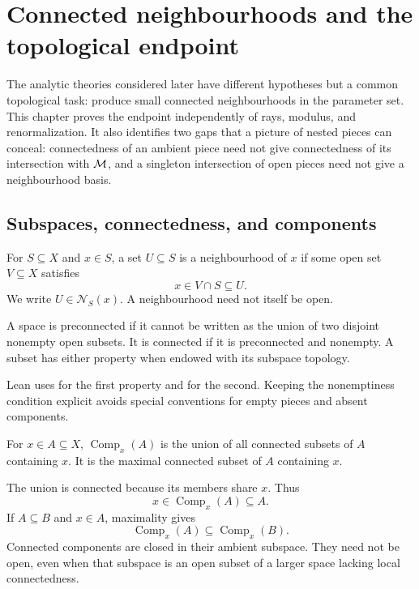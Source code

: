 \chapter[Connected neighbourhoods and topological endpoints]{Connected neighbourhoods and the topological endpoint}
\label{chap:topological-foundations}

The analytic theories considered later have different hypotheses but a
common topological task: produce small connected neighbourhoods in the
parameter set.  This chapter proves the endpoint independently of rays,
modulus, and renormalization.  It also identifies two gaps that a picture
of nested pieces can conceal: connectedness of an ambient piece need not
give connectedness of its intersection with $\mathcal M$, and a singleton
intersection of open pieces need not give a neighbourhood basis.

\section{Subspaces, connectedness, and components}

\begin{definition}
For $S\subseteq X$ and $x\in S$, a set $U\subseteq S$ is a neighbourhood
of $x$ if some open set $V\subseteq X$ satisfies
\[
 x\in V\cap S\subseteq U.
\]
We write $U\in\mathcal N_S(x)$.  A neighbourhood need not itself be open.
\end{definition}

\begin{definition}
A space is preconnected if it cannot be written as the union of two
disjoint nonempty open subsets.  It is connected if it is preconnected
and nonempty.  A subset has either property when endowed with its
subspace topology.
\end{definition}

Lean uses  for the first property and
 for the second.  Keeping the nonemptiness condition
explicit avoids special conventions for empty pieces and absent
components.

\begin{definition}
For $x\in A\subseteq X$, $\operatorname{Comp}_x(A)$ is the union of all
connected subsets of $A$ containing $x$.  It is the maximal connected
subset of $A$ containing $x$.
\end{definition}

The union is connected because its members share $x$.  Thus
\[
 x\in\operatorname{Comp}_x(A)\subseteq A.
\]
If $A\subseteq B$ and $x\in A$, maximality gives
\[
 \operatorname{Comp}_x(A)\subseteq\operatorname{Comp}_x(B).
\]
Connected components are closed in their ambient subspace.  They need
not be open, even when that subspace is an open subset of a larger
space lacking local connectedness.

